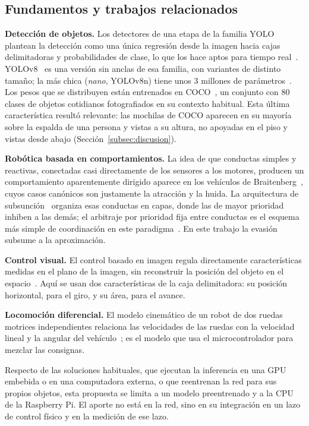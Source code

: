 \documentclass[pdflatex,sn-mathphys-num]{sn-jnl}
\begin{document}
\subsection{Fundamentos y trabajos relacionados}\label{subsec:fundamentos}

\textbf{Detecci\'on de objetos.} Los detectores de una etapa de la familia
YOLO plantean la detecci\'on como una \'unica regresi\'on desde la imagen
hacia cajas delimitadoras y probabilidades de clase, lo que los hace aptos
para tiempo real~\cite{ref:yolo}. YOLOv8~\cite{ref:yolov8} es una versi\'on sin
anclas de esa familia, con variantes de distinto tama\~no; la m\'as chica
(\emph{nano}, YOLOv8n) tiene unos 3 millones de par\'ametros~\cite{ref:yolorev}.
Los pesos que se distribuyen est\'an entrenados en COCO~\cite{ref:coco}, un
conjunto con 80 clases de objetos cotidianos fotografiados en su contexto
habitual. Esta \'ultima caracter\'istica result\'o relevante: las mochilas de
COCO aparecen en su mayor\'ia sobre la espalda de una persona y vistas a su
altura, no apoyadas en el piso y vistas desde abajo
(Secci\'on~\ref{subsec:discusion}).

\textbf{Rob\'otica basada en comportamientos.} La idea de que conductas
simples y reactivas, conectadas casi directamente de los sensores a los
motores, producen un comportamiento aparentemente dirigido aparece en los
veh\'iculos de Braitenberg~\cite{ref:braitenberg}, cuyos casos can\'onicos son
justamente la atracci\'on y la huida. La arquitectura de
subsunci\'on~\cite{ref:brooks} organiza esas conductas en capas, donde las de
mayor prioridad inhiben a las dem\'as; el arbitraje por prioridad fija entre
conductas es el esquema m\'as simple de coordinaci\'on en este
paradigma~\cite{ref:arkin}. En este trabajo la evasi\'on subsume a la
aproximaci\'on.

\textbf{Control visual.} El control basado en imagen regula directamente
caracter\'isticas medidas en el plano de la imagen, sin reconstruir la
posici\'on del objeto en el espacio~\cite{ref:visualservo}. Aqu\'i se usan dos
caracter\'isticas de la caja delimitadora: su posici\'on horizontal, para el
giro, y su \'area, para el avance.

\textbf{Locomoci\'on diferencial.} El modelo cinem\'atico de un robot de dos
ruedas motrices independientes relaciona las velocidades de las ruedas con
la velocidad lineal y la angular del veh\'iculo~\cite{ref:siegwart}; es el
modelo que usa el microcontrolador para mezclar las consignas.

Respecto de las soluciones habituales, que ejecutan la inferencia en una GPU
embebida o en una computadora externa, o que reentrenan la red para sus
propios objetos, esta propuesta se limita a un modelo preentrenado y a la CPU
de la Raspberry Pi. El aporte no est\'a en la red, sino en su integraci\'on en
un lazo de control f\'isico y en la medici\'on de ese lazo.
\end{document}
